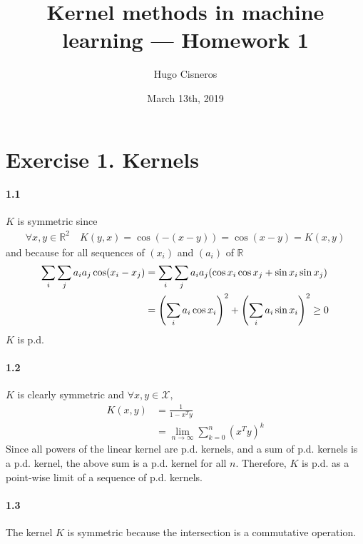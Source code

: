 \documentclass[10pt]{article}
\title{\Large Kernel methods in machine learning --- Homework 1}
\author{Hugo Cisneros}
\date{March 13th, 2019}
\begin{document}
    \maketitle

    \section*{Exercise 1. Kernels}

    \paragraph{1.1} $K$ is symmetric since 
    \begin{align*}
        \forall x,y \in \mathbb{R}^2 \quad K(y, x) = \cos(-(x-y)) = \cos(x - y) = 
        K(x, y)
    \end{align*}
    and because for all sequences of $(x_i)$ and $(a_i)$ of $\mathbb{R}$
    \begin{align*}
        \tiny
        \sum_i\sum_j a_i a_j \cos(x_i - x_j) &= \sum_i\sum_j a_i a_j (\cos x_i
        \cos x_j + \sin x_i \sin x_j)\\
        &= \left(\sum_i a_i \cos x_i\right)^2 + \left(\sum_i a_i 
        \sin x_i\right)^2 \geq 0
    \end{align*}
    $K$ is p.d.

    \paragraph{1.2}
    $K$ is clearly symmetric and $\forall x, y \in \mathcal{X}, $
    \begin{align*}
        K(x,y) &= \frac{1}{1 - x^Ty}\\
        & = \lim_{n\rightarrow\infty} \sum_{k=0}^n (x^T y)^k \tag{converges 
        because by C-S $|x^Ty|
        \leq \lVert x \rVert_2\lVert y\rVert_2 < 1$}
    \end{align*}
    Since all powers of the linear kernel are p.d. kernels, and a sum of p.d. 
    kernels is a p.d. kernel, the above sum is a p.d. kernel for all $n$.
    Therefore, $K$ is p.d. as a point-wise limit of a sequence of p.d. kernels. 
    \paragraph{1.3} The kernel $K$ is symmetric because the intersection is a 
    commutative operation. 
\end{document}

